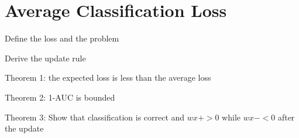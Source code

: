 \section{Average Classification Loss}

Define the loss and the problem

Derive the update rule


Theorem 1: the expected loss is less than the average loss

Theorem 2: 1-AUC is bounded 

Theorem 3: Show that classification is correct and $w x+ >0$ while $w x- < 0$ after the update
